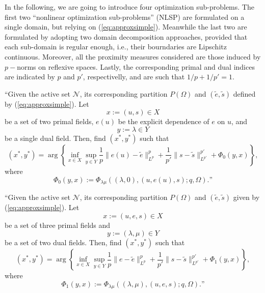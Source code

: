 In the following, we are going to introduce four optimization sub-problems. The first two ``nonlinear optimization sub-problems'' (NLSP) are formulated on a single domain, but relying on (\ref{eq:approxsimple}).  Meanwhile the last two are formulated by adopting two domain decomposition approaches, provided that each sub-domain is regular enough, i.e., their bourndaries are Lipschitz continuous. Moreover, all the proximity measures considered are those induced by $p-$norms on reflexive spaces. Lastly, the corresponding primal and dual indices are indicated by $p$ and $p'$, respectivelly, and are such that $1/p+1/p' = 1$.
%
\begin{problem}[NLSP0]
\hspace{-2mm}``Given the active set $\mathcal{N}$, its corresponding partition $P(\Omega)$ and $(\tilde{e},\tilde{s})$ defined by (\ref{eq:approxsimple}). Let 
\begin{equation}
x := 
(u, s)
\in X
\end{equation}
be a set of two primal fields, $e(u)$ be the explicit dependence of $e$ on $u$, and
\begin{equation}
y :=
\lambda
\in Y
\end{equation}
be a single dual field. Then, find $(x^*, y^*)$ such that
\begin{equation}
(x^*, y^*) =
\arg
\left\{
\inf_{x \in X}
\sup_{y \in Y}
\frac{1}{p}\|e(u)-\tilde{e}\|^{p}_{L^p}+
\frac{1}{p'}\|s-\tilde{s}\|^{p'}_{L^{p'}}+
\Phi_0(y,x)
\right\},
\end{equation}
where
\begin{equation}
    \Phi_0(y,x) := \Phi_{\lambda\mu}((\lambda, 0), (u, e(u), s); q, \Omega).\textrm{''}
\end{equation}
\end{problem}
%
\begin{problem}[NLSP1]
\hspace{-2mm}``Given the active set $\mathcal{N}$, its corresponding partition 
$P(\Omega)$ and $(\tilde{e},\tilde{s})$ given by (\ref{eq:approxsimple}). Let 
\begin{equation}
x := 
(u, e, s)
\in X
\end{equation}
be a set of three primal fields and
\begin{equation}
y :=
(\lambda, \mu)
\in Y
\end{equation}
be a set of two dual fields. Then, find $(x^*, y^*)$ such that
\begin{equation}
(x^*, y^*) =
\arg
\left\{
\inf_{x \in X}
\sup_{y \in Y}
\frac{1}{p}\|e-\tilde{e}\|^p_{L^p}+
\frac{1}{p'}\|s-\tilde{s}\|^{p'}_{L^{p'}}+
\Phi_1(y,x)
\right\},
\end{equation}
where
\begin{equation}
\Phi_1(y,x) := \Phi_{\lambda\mu}((\lambda, \mu), (u, e, s); q, \Omega).\textrm{''}
\end{equation}
\end{problem}

